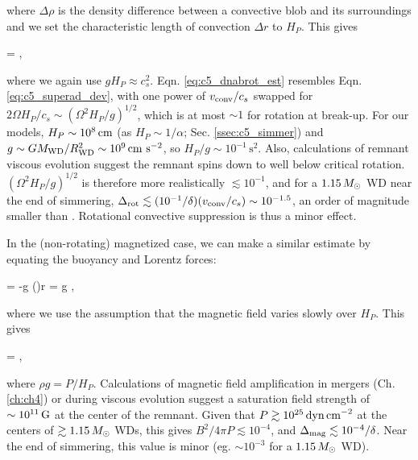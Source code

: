 \noindent where $\Delta \rho$ is the density difference between a convective blob and its surroundings and we set the characteristic length of convection $\Delta r$ to $H_P$.  This gives

\eqbegin
\dnabrot = ,
\label{eq:c5_dnabrot_est}
\eqend

\noindent where we again use $g H_P \approx c_s^2$.  Eqn. \ref{eq:c5_dnabrot_est} resembles Eqn. \ref{eq:c5_superad_dev}, with one power of $\vconv/c_s$ swapped for $2\Omega H_P/c_s \sim (\Omega^2 H_P/g)^{1/2}$, which is at most $\sim1$ for rotation at break-up.  For our models, $H_P \sim 10^8\,\mathrm{cm}$ (as $H_P \sim 1/\alpha$; Sec. \ref{ssec:c5_simmer}) and $g \sim GM_\mrm{WD}/R_\mrm{WD}^2 \sim 10^9\,\cmpsecsq$, so $H_P/g \sim 10^{-1}\,\mathrm{s}^2$.  Also, calculations of remnant viscous evolution \citep{shen+12, schw+12, ji+13} suggest the remnant spins down to well below critical rotation.  $(\Omega^2 H_P/g)^{1/2}$ is therefore more realistically $\lesssim10^{-1}$, and for a $1.15\,\Msun$ WD near the end of simmering, $\dnabrot \lesssim (10^{-1}/\delta)(\vconv/c_s) \sim 10^{-1.5}$, an order of magnitude smaller than \nablaad.  Rotational convective suppression is thus a minor effect.  

In the (non-rotating) magnetized case, we can make a similar estimate by equating the buoyancy and Lorentz forces:

\eqbegin
{} = -g \left(\right)\Delta r = \rho g \delta \dnabmag,
\label{eq:c5_dnabmag_est_work}
\eqend

\noindent where we use the assumption that the magnetic field varies slowly over $H_P$.  This gives

\eqbegin
\dnabmag = ,
\label{eq:c5_dnabmag_est}
\eqend

\noindent where $\rho g = P/H_P$.  Calculations of magnetic field amplification in mergers (Ch. \ref{ch:ch4}) or during viscous evolution \citep{ji+13} suggest a saturation field strength of $\sim10^{11}\,\mathrm{G}$ at the center of the remnant.  Given that $P \gtrsim 10^{25}\,\mathrm{dyn\,cm}^{-2}$ at the centers of $\gtrsim 1.15\,\Msun$ WDs, this gives $B^2/4\pi P \lesssim 10^{-4}$, and $\dnabmag \lesssim 10^{-4}/\delta$.  Near the end of simmering, this value is minor (eg. $\sim10^{-3}$ for a $1.15\,\Msun$ WD).

